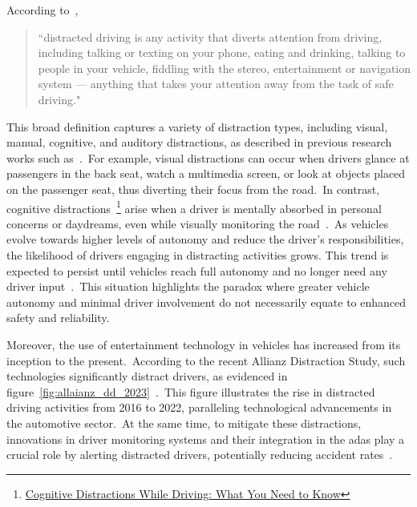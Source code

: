 According to~\citet{NHTSA2023}, 
\begin{quote}
    ``distracted driving is any activity that diverts attention from driving, including talking or texting on your phone, eating and drinking, talking to people in your vehicle, fiddling with the stereo, entertainment or navigation system — anything that takes your attention away from the task of safe driving."~\citep{NHTSA2023}
\end{quote}
This broad definition captures a variety of distraction types, including visual, manual, cognitive, and auditory distractions, as described in previous research works such as~\citet{moslemi2021computer, M1_regan2011driver, manual_li2020detection}.~For example, visual distractions can occur when drivers glance at passengers in the back seat, watch a multimedia screen, or look at objects placed on the passenger seat, thus diverting their focus from the road.~In contrast, cognitive distractions~\footnote{\href{https://www.drivesafeonline.org/traffic-school/cognitive-distractions/}{Cognitive Distractions While Driving: What You Need to Know}} arise when a driver is mentally absorbed in personal concerns or daydreams, even while visually monitoring the road~\citep{moslemi2021computer}.~As vehicles evolve towards higher levels of autonomy and reduce the driver's responsibilities, the likelihood of drivers engaging in distracting activities grows. This trend is expected to persist until vehicles reach full autonomy and no longer need any driver input~\citep{bing_li_2022new}.~This situation highlights the paradox where greater vehicle autonomy and minimal driver involvement do not necessarily equate to enhanced safety and reliability.

Moreover, the use of entertainment technology in vehicles has increased from its inception to the present.~According to the recent Allianz Distraction Study, such technologies significantly distract drivers, as evidenced in figure~\ref{fig:allaianz_dd_2023}~\citep{study_new_Allianz2023}.~This figure illustrates the rise in distracted driving activities from 2016 to 2022, paralleling technological advancements in the automotive sector.~At the same time, to mitigate these distractions, innovations in driver monitoring systems and their integration in the \gls{adas} play a crucial role by alerting distracted drivers, potentially reducing accident rates~\citep{moslemi2021computer}.

